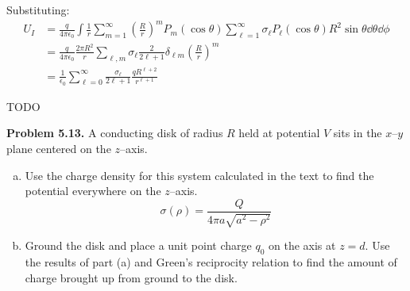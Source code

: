 \documentclass{article}
\begin{document}
Substituting:
\[
\begin{aligned}
    U_I &= \frac{q}{4\pi\epsilon_0}\int \frac{1}{r}\sum_{m=1}^\infty \left(\frac{R}{r}\right)^m P_m(\cos\theta)\sum_{\ell = 1}^\infty \sigma_\ell P_\ell(\cos\theta)R^2 \sin\theta \dd{\theta}\dd{\phi} \\
    &= \frac{q}{4\pi\epsilon_0}\frac{2\pi R^2}{r}\sum_{\ell, m}\sigma_\ell \frac{2}{2\ell + 1}\delta_{\ell m} \left(\frac{R}{r}\right)^m \\
    &= \frac{1}{\epsilon_0}\sum_{\ell = 0}^\infty \frac{\sigma_\ell}{2\ell + 1}\frac{qR^{\ell+2}}{r^{\ell + 1}}
\end{aligned}
\]

TODO

\hrulefill

\textbf{Problem 5.13.} A conducting disk of radius $R$ held at potential $V$ sits in the $x$--$y$ plane centered on the $z$--axis.
\begin{enumerate}[(a)]
    \item Use the charge density for this system calculated in the text to find the potential everywhere on the $z$--axis.
    \begin{equation}
        \sigma(\rho) = \frac{Q}{4\pi a\sqrt{a^2-\rho^2}}\tag{5.33}\label{eq:5.33}
    \end{equation}
        
    \item Ground the disk and place a unit point charge $q_0$ on the axis at $z = d$. Use the results of part (a) and Green’s reciprocity relation to find the amount of charge brought up from ground to the disk.
\end{enumerate}
\end{document}

